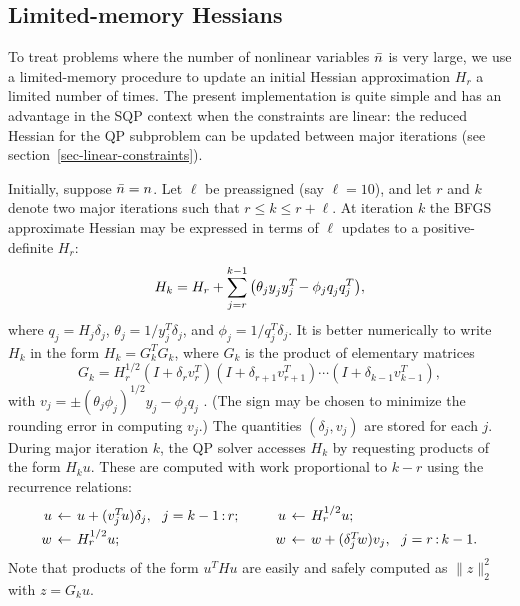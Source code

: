 \documentclass[draft,leqno,onefignum,onetabnum]{siamltex}
\def\drop{^{\null}}
\def\km#1{_{k-#1}}
\def\nbar{\skew2\bar n}
\def\norm#1{\|#1\|}
\def\T{^T\!}
\newcommand{\till}{\,{:}\,}                 %
\newcommand{\twonorm}[1]{\norm{#1}_2}
\begin{document}
 \subsection{Limited-memory Hessians} \label{sec-LM}

To treat problems where the number of nonlinear variables $\nbar$ is very
large, we use a limited-memory procedure to update an initial Hessian
approximation $H_r$ a limited number of times.  The present
implementation is quite simple and has an advantage in the SQP
context when the constraints are linear: the reduced Hessian
for the QP subproblem can be updated between major iterations
(see section~\ref{sec-linear-constraints}).

Initially, suppose $\nbar = n$.  Let $\ell$ be preassigned (say $\ell
= 10$), and let $r$ and $k$ denote two major iterations such that $r
\le k \le r + \ell$.  At iteration $k$ the BFGS approximate Hessian
may be expressed in terms of $\ell$ updates to a positive-definite
$H_r$:
\begin{equation}                                \label{eqn-LMH}
        H_k = H_r + \sum_{j=r}^{k-1}
                \big(\theta_j y_j\drop y_j\T - \phi_j q_j\drop q_j^T \big),
\end{equation}
where $q_j = H_j \delta_j$, $\theta_j = 1 / y_j\T \delta_j$, and
$\phi_j = 1 / q_j\T \delta_j$.  It is better numerically to write
$H_k$ in the form $H_k = G_k^T G_k$, where $G_k$ is the product of
elementary matrices
\begin{equation}                                \label{eqn-LMH0}
        G_k =  H_r^{1/2}(I + \delta_r v_r^T)
                      (I + \delta_{r+1} v_{r+1}^T)
                        \cdots (I + \delta\km1 v\km1^T),
\end{equation}
with $v_j = \pm (\theta_j \phi_j)^{1/2}y_j -\phi_j q_j$
\cite{BroGG73}.  (The sign may be chosen to minimize the rounding
error in computing $v_j$.)  The quantities $(\delta_j, v_j)$ are stored for
each $j$. During major iteration $k$, the QP solver accesses $H_k$ by
requesting products of the form $H_k u$.  These are computed with work
proportional to $k-r$ using the recurrence relations:
$$
 \begin{array}{r@{\hspace{4pt}}c@{\hspace{4pt}}l%
              cr@{\hspace{4pt}}c@{\hspace{4pt}}l}
  u &\gets& u + (v_j\T u) \delta_j, \ \ j=k-1\till r; &\ \ & u &\gets& H_r^{1/2}u;  \\[3pt]
  w &\gets& H_r^{1/2}u;                               &    & w &\gets&  w + (\delta_j\T w) v_j, \ \ j=r\till k-1.
    \end{array}
$$
Note that products of the form $u\T Hu$ are easily and safely computed as
$\twonorm{z}^2$ with $z = G_k u$.
\end{document}
